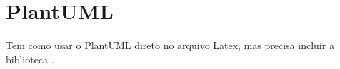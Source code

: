 \section{PlantUML}

Tem como usar o PlantUML direto no arquivo Latex, mas precisa incluir a biblioteca \cite{hartmannSpatialPresenceTheory2015}.

